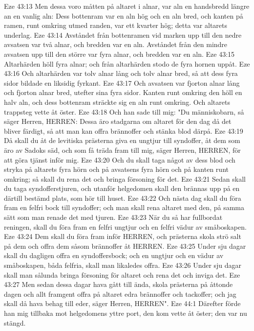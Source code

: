 Eze 43:13  Men dessa voro måtten på altaret i alnar, var aln en handsbredd längre an en vanlig aln: Dess bottenram var en aln hög och en aln bred, och kanten på ramen, runt omkring utmed randen, var ett kvarter hög; detta var altarets underlag.
Eze 43:14  Avståndet från bottenramen vid marken upp till den nedre avsatsen var två alnar, och bredden var en aln. Avståndet från den mindre avsatsen upp till den större var fyra alnar, och bredden var en aln.
Eze 43:15  Altarhärden höll fyra alnar; och från altarhärden stodo de fyra hornen uppåt.
Eze 43:16  Och altarhärden var tolv alnar lång och tolv alnar bred, så att dess fyra sidor bildade en liksidig fyrkant.
Eze 43:17  Och avsatsen var fjorton alnar lång och fjorton alnar bred, utefter sina fyra sidor. Kanten runt omkring den höll en halv aln, och dess bottenram sträckte sig en aln runt omkring. Och altarets trappsteg vette åt öster.
Eze 43:18  Och han sade till mig: "Du människobarn, så säger Herren, HERREN: Dessa äro stadgarna om altaret för den dag då det bliver färdigt, så att man kan offra brännoffer och stänka blod därpå.
Eze 43:19  Då skall du åt de levitiska prästerna giva en ungtjur till syndoffer, åt dem som äro av Sadoks säd, och som få träda fram till mig, säger Herren, HERREN, för att göra tjänst inför mig.
Eze 43:20  Och du skall taga något av dess blod och stryka på altarets fyra hörn och på avsatsens fyra hörn och på kanten runt omkring; så skall du rena det och bringa försoning för det.
Eze 43:21  Sedan skall du taga syndofferstjuren, och utanför helgedomen skall den brännas upp på en därtill bestämd plats, som hör till huset.
Eze 43:22  Och nästa dag skall du föra fram en felfri bock till syndoffer; och man skall rena altaret med den, på samma sätt som man renade det med tjuren.
Eze 43:23  När du så har fullbordat reningen, skall du föra fram en felfri ungtjur och en felfri vädur av småboskapen.
Eze 43:24  Dem skall du föra fram inför HERREN, och prästerna skola strö salt på dem och offra dem såsom brännoffer åt HERREN.
Eze 43:25  Under sju dagar skall du dagligen offra en syndoffersbock; och en ungtjur och en vädur av småboskapen, båda felfria, skall man likaledes offra.
Eze 43:26  Under sju dagar skall man sålunda bringa försoning för altaret och rena det och inviga det.
Eze 43:27  Men sedan dessa dagar hava gått till ända, skola prästerna på åttonde dagen och allt framgent offra på altaret edra brännoffer och tackoffer; och jag skall då hava behag till eder, säger Herren, HERREN".
Eze 44:1  Därefter förde han mig tillbaka mot helgedomens yttre port, den kom vette åt öster; den var nu stängd.
